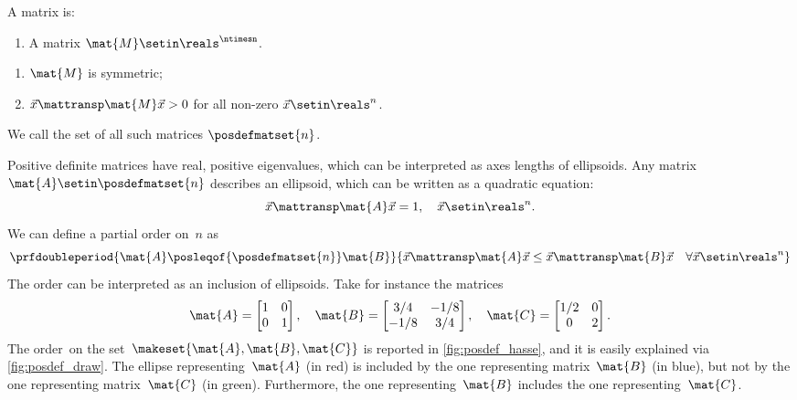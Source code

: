 \begin{definition}
    \label{def:positive-definite-matrices}
    A  matrix is:

    \constit
    \begin{enumerate}
        \item A matrix $\mat{M}\setin \reals^{\ntimesn}$.
    \end{enumerate}

    \condit
    \begin{enumerate}
        \item $\mat{M}$ is symmetric;
        \item $\vec{x}\mattransp \mat{M}\vec{x}> 0$ for all non-zero $\vec{x}\setin \reals^n$.
    \end{enumerate}
    We call the set of all such matrices $\posdefmatset{n}$.
\end{definition}
Positive definite matrices have real, positive eigenvalues, which can be interpreted as axes lengths of ellipsoids.
Any matrix~$\mat{A}\setin \posdefmatset{n}$ describes an ellipsoid, which can be written as a quadratic equation:
\begin{equation}
    \label{eq:posdef-ellipsoid}
    \vec{x}\mattransp \mat{A}\vec{x}=1,\quad \vec{x}\setin \reals^n.
\end{equation}
We can define a partial order on~$n$ as
\begin{equation}
    \label{eq:posdef-order}
    \prfdoubleperiod{
        \mat{A}\posleqof{\posdefmatset{n}} \mat{B}
    }{
        \vec{x}\mattransp \mat{A}\vec{x}\leq \vec{x}\mattransp \mat{B}\vec{x} \quad \forall \vec{x}\setin \reals^n
    }
\end{equation}
The order can be interpreted as an inclusion of ellipsoids.
Take for instance the matrices
\begin{equation}
    \label{eq:posdef-matrices}
    \mat{A}=
    \begin{bmatrix}
        1 & 0 \\ 0& 1
    \end{bmatrix}, \quad \mat{B}=
    \begin{bmatrix}
        3/4 & -1/8 \\ -1/8& 3/4
    \end{bmatrix},\quad \mat{C}=
    \begin{bmatrix}
        1/2 & 0 \\0& 2
    \end{bmatrix}.
\end{equation}
The order~\posA on the set~$\makeset{\mat{A},\mat{B},\mat{C}}$ is reported in \cref{fig:posdef_hasse}, and it is easily explained via \cref{fig:posdef_draw}.
The ellipse representing~$\mat{A}$ (in red) is included by the one representing matrix~$\mat{B}$ (in blue), but not by the one representing matrix~$\mat{C}$ (in green).
Furthermore, the one representing~$\mat{B}$ includes the one representing~$\mat{C}$.




